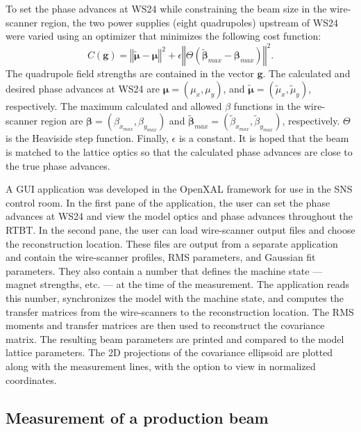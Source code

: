 To set the phase advances at WS24 while constraining the beam size in the wire-scanner region, the two power supplies (eight quadrupoles) upstream of WS24 were varied using an optimizer that minimizes the following cost function:
%
\begin{equation}
    C(\mathbf{g}) = \left\Vert{\tilde{\bm{\mu}} - \bm{\mu} }\right\Vert^2
    + 
    \epsilon
    \left\Vert
    \Theta\left(
        \tilde{\bm{\beta}}_{max} - \bm{\beta}_{max}
    \right)
    \right\Vert^2
    .
\end{equation}
%
The quadrupole field strengths are contained in the vector $\mathbf{g}$. The calculated and desired phase advances at WS24 are $\bm{\mu} = (\mu_x, \mu_y)$, and $\tilde{\bm{\mu}} = (\tilde{\mu}_x, \tilde{\mu}_y)$, respectively. The maximum calculated and allowed $\beta$ functions in the wire-scanner region are $\bm{\beta} = (\beta_{x_{max}}, \beta_{y_{max}})$ and $\tilde{\bm{\beta}}_{max} = (\tilde{\beta}_{x_{max}}, \tilde{\beta}_{y_{max}})$, respectively. $\Theta$ is the Heaviside step function. Finally, $\epsilon$ is a constant. It is hoped that the beam is matched to the lattice optics so that the calculated phase advances are close to the true phase advances.

A GUI application was developed in the OpenXAL framework for use in the SNS control room. In the first pane of the application, the user can set the phase advances at WS24 and view the model optics and phase advances throughout the RTBT. In the second pane, the user can load wire-scanner output files and choose the reconstruction location. These files are output from a separate application and contain the wire-scanner profiles, RMS parameters, and Gaussian fit parameters. They also contain a number that defines the machine state — magnet strengths, etc. — at the time of the measurement. The application reads this number, synchronizes the model with the machine state, and computes the transfer matrices from the wire-scanners to the reconstruction location. The RMS moments and transfer matrices are then used to reconstruct the covariance matrix. The resulting beam parameters are printed and compared to the model lattice parameters. The 2D projections of the covariance ellipsoid are plotted along with the measurement lines, with the option to view in normalized coordinates. 



\subsection{Measurement of a production beam}

